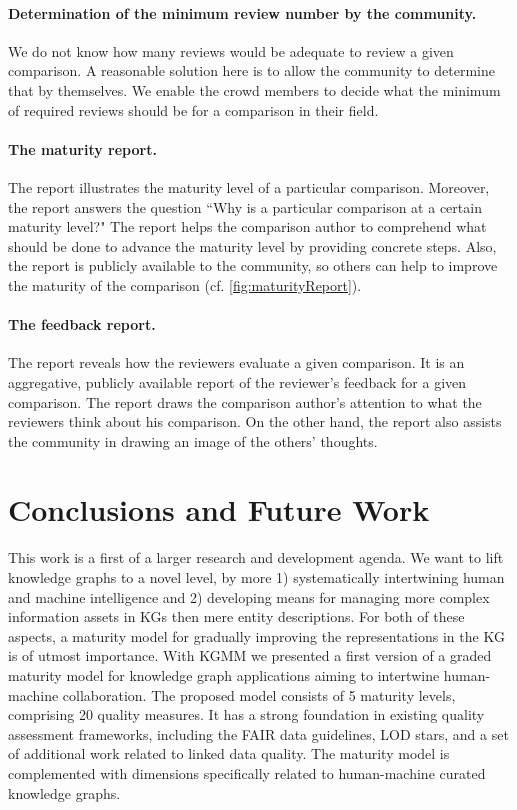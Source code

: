 \documentclass[runningheads]{llncs}
\begin{document}
\vspace{-.2cm}
\paragraph{Determination of the minimum review number by the community.} We do not know how many reviews would be adequate to review a given comparison. A reasonable solution here is to allow the community to determine that by themselves. We enable the crowd members to decide what the minimum of required reviews should be for a comparison in their field.

\vspace{-.2cm}
\paragraph{The maturity report.} The report illustrates the maturity level of a particular comparison. Moreover, the report answers the question ``Why is a particular comparison at a certain maturity level?" The report helps the comparison author to comprehend what should be done to advance the maturity level by providing concrete steps. Also, the report is publicly available to the community, so others can help to improve the maturity of the comparison (cf. \autoref{fig:maturityReport}).

\vspace{-.2cm}
\paragraph{The feedback report.} The report reveals how the reviewers evaluate a given comparison. It is an aggregative, publicly available report of the reviewer’s feedback for a given comparison. The report draws the comparison author’s attention to what the reviewers think about his comparison. On the other hand, the report also assists the community in drawing an image of the others' thoughts.

\section{Conclusions and Future Work}
\label{sec:conclusions}

This work is a first of a larger research and development agenda.
We want to lift knowledge graphs to a novel level, by more 1) systematically intertwining human and machine intelligence and 2) developing means for managing more complex information assets in KGs then mere entity descriptions.
For both of these aspects, a maturity model for gradually improving the representations in the KG is of utmost importance.
With KGMM we presented a first version of a graded maturity model for knowledge graph applications aiming to intertwine human-machine collaboration.
The proposed model consists of 5 maturity levels, comprising 20 quality measures. 
It has a strong foundation in existing quality assessment frameworks, including the FAIR data guidelines, LOD stars, and a set of additional work related to linked data quality. 
The maturity model is complemented with dimensions specifically related to human-machine curated knowledge graphs.
\end{document}
